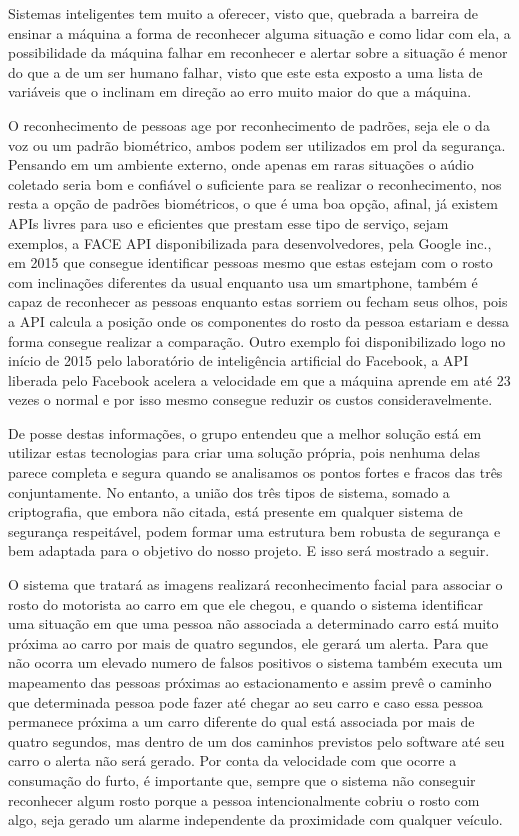     Sistemas inteligentes tem muito a oferecer, visto que, quebrada a barreira de ensinar a máquina a forma de reconhecer alguma situação e como lidar com ela, a possibilidade da máquina falhar em reconhecer e alertar sobre a situação é menor do que a de um ser humano falhar, visto que este esta exposto a uma lista de variáveis que o inclinam em direção ao erro muito maior do que a máquina.
    
    O reconhecimento de pessoas age por reconhecimento de padrões, seja ele o da voz ou um padrão biométrico, ambos podem ser utilizados em prol da segurança. Pensando em um ambiente externo, onde apenas em raras situações o aúdio coletado seria bom e confiável o suficiente para se realizar o reconhecimento, nos resta a opção de padrões biométricos, o que é uma boa opção, afinal, já existem APIs livres para uso e eficientes que prestam esse tipo de serviço, sejam exemplos, a FACE API disponibilizada para desenvolvedores, pela Google inc., em 2015 que consegue identificar pessoas mesmo que estas estejam com o rosto com inclinações diferentes da usual enquanto usa um smartphone, também é capaz de reconhecer as pessoas enquanto estas sorriem ou fecham seus olhos, pois a API calcula a posição onde os componentes do rosto da pessoa estariam e dessa forma consegue realizar a comparação. Outro exemplo foi disponibilizado logo no início de 2015 pelo laboratório de inteligência artificial do Facebook, a API liberada pelo Facebook acelera a velocidade em que a máquina aprende em até 23 vezes o normal e por isso mesmo consegue reduzir os custos consideravelmente.
    
    De posse destas informações, o grupo entendeu que a melhor solução está em utilizar estas tecnologias para criar uma solução própria, pois nenhuma delas parece completa e segura quando se analisamos os pontos fortes e fracos das três conjuntamente. No entanto, a união dos três tipos de sistema, somado a criptografia, que embora não citada, está presente em qualquer sistema de segurança respeitável, podem formar uma estrutura bem robusta de segurança e bem adaptada para o objetivo do nosso projeto. E isso será mostrado a seguir.
    
    O sistema que tratará as imagens realizará reconhecimento facial para associar o rosto do motorista ao carro em que ele chegou, e quando o sistema identificar uma situação em que uma pessoa não associada a determinado carro está muito próxima ao carro por mais de quatro segundos, ele gerará um alerta. Para que não ocorra um elevado numero de falsos positivos o sistema também executa um  mapeamento das pessoas próximas ao estacionamento e assim prevê o caminho que determinada pessoa pode fazer até chegar ao seu carro e caso essa pessoa permanece próxima a um carro diferente do qual está associada por mais de quatro segundos, mas dentro de um dos caminhos previstos pelo software até seu carro o alerta não será gerado. Por conta da velocidade com que ocorre a consumação do furto, é importante que, sempre que o sistema não conseguir reconhecer algum rosto porque a pessoa intencionalmente cobriu o rosto com algo, seja gerado um alarme independente da proximidade com qualquer veículo.

